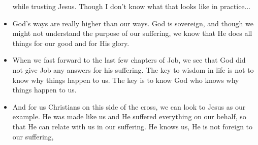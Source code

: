 \begin{itemize}
{{  while trusting Jesus. Though I don't know what that looks like in
  practice... }}
  \item{God's ways are really higher than our ways. God is sovereign, and
  though we might not understand the purpose of our suffering, we know that
  He does all things for our good and for His glory. }
  \item{When we fast forward to the last few chapters of Job, we see that God did not give Job any answers for his suffering. The key to wisdom in life is not to know why things happen to us. The key is to know God who knows why things happen to us.}
  \item{And for us Christians on this side of the cross, we can look to Jesus as our example. He was made like us and He suffered everything on our behalf, so that He can relate with us in our suffering. He knows us, He is not foreign to our suffering, }

\end{itemize}